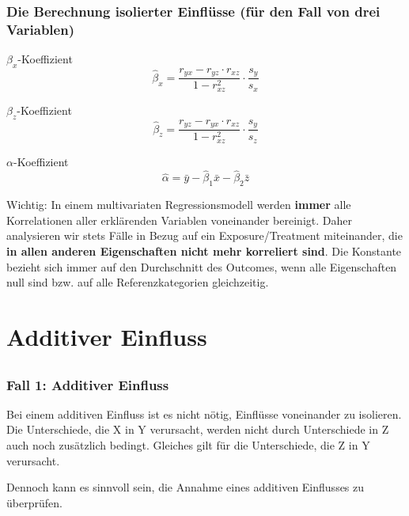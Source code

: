 \documentclass[18pt, aspectratio=169]{beamer}
\begin{document}
\begin{frame}
\frametitle{Die Berechnung isolierter Einflüsse (für den Fall von drei Variablen)}

$\beta_x$-Koeffizient
\begin{equation}
\hat{\beta}_x=\frac{r_{y{x}}-r_{y{z}}\cdot r_{{x}{z}}}{1-r_{{x}{z}}^2}\cdot\frac{s_y}{s_{x}}
\end{equation}

$\beta_z$-Koeffizient
\begin{equation}
\hat{\beta}_z=\frac{r_{y{z}}-r_{y{x}}\cdot r_{xz}}{1-r_{{x}{z}}^2}\cdot\frac{s_y}{s_{z}}
\end{equation}

$\alpha$-Koeffizient
\begin{equation}
\hat{\alpha} =\bar{y}-\hat{\beta}_1\bar{x}-\hat{\beta}_2\bar{z}
\end{equation}

\vfill 

Wichtig: In einem multivariaten Regressionsmodell werden \textbf{immer} alle Korrelationen aller erklärenden Variablen voneinander bereinigt. Daher analysieren wir stets Fälle in Bezug auf ein Exposure/Treatment miteinander, die \textbf{in allen anderen Eigenschaften nicht mehr korreliert sind}. Die Konstante bezieht sich immer auf den Durchschnitt des Outcomes, wenn alle Eigenschaften null sind bzw. auf alle Referenzkategorien gleichzeitig. 

\end{frame}




\section{Additiver Einfluss}
\subsection*{}



\begin{frame}
\frametitle{Fall 1:  Additiver Einfluss}
\begin{figure}
\centering
{}
\end{figure}

\vfill 

Bei einem additiven Einfluss ist es nicht nötig, Einflüsse voneinander zu isolieren. Die Unterschiede, die X in Y verursacht, werden nicht durch Unterschiede in Z auch noch zusätzlich bedingt. Gleiches gilt für die Unterschiede, die Z in Y verursacht. 

Dennoch kann es sinnvoll sein, die Annahme eines additiven Einflusses zu überprüfen. 
\end{frame}
\end{document}
